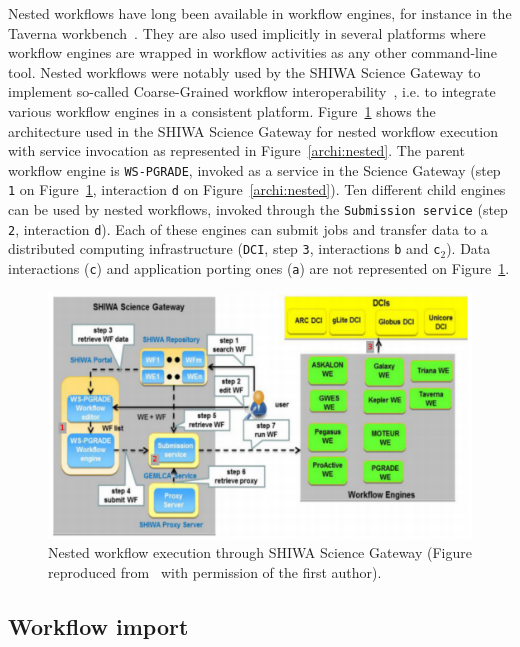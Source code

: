 \documentclass[preprint,3p,twocolumn]{elsarticle}
\begin{document}
Nested workflows have long been available in workflow engines, for
instance in the Taverna workbench~\cite{oinn2004taverna}. They are
also used implicitly in several platforms where workflow engines are
wrapped in workflow activities as any other command-line tool. Nested
workflows were notably used by the SHIWA Science Gateway to implement
so-called Coarse-Grained workflow
interoperability~\cite{terstyanszky2014enabling}, i.e. to integrate
various workflow engines in a consistent
platform. Figure~\ref{fig:shiwa-architecture} shows the architecture
used in the SHIWA Science Gateway for nested workflow execution with
service invocation as represented in Figure~\ref{archi:nested}. The
parent workflow engine is \texttt{WS-PGRADE}, invoked as a service in
the Science Gateway (step \texttt{1} on
Figure~\ref{fig:shiwa-architecture}, interaction \texttt{d} on
Figure~\ref{archi:nested}). Ten different child engines can be used by
nested workflows, invoked through the \texttt{Submission service}
(step \texttt{2}, interaction \texttt{d}). Each of these engines can
submit jobs and transfer data to a distributed computing
infrastructure (\texttt{DCI}, step \texttt{3}, interactions \texttt{b}
and \texttt{c$_2$}). Data interactions (\texttt{c}) and application
porting ones (\texttt{a}) are not represented on
Figure~\ref{fig:shiwa-architecture}.

\begin{figure}
\centering
\includegraphics[width=1.5\columnwidth]{figures/shiwa-science-gateway.pdf}
\caption{Nested workflow execution through SHIWA Science Gateway
  (Figure reproduced from~\cite{terstyanszky2014enabling} with
  permission of the first author).}
\label{fig:shiwa-architecture}
\end{figure}

\subsection{Workflow import}
\end{document}
